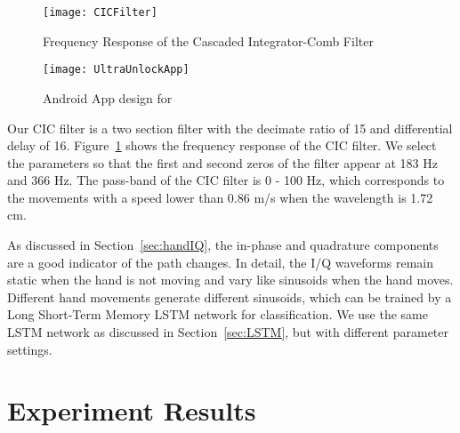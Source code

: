 \begin{figure}[h]
	\centering
	\texttt{[image: CICFilter]}
	\caption{Frequency Response of the Cascaded Integrator-Comb Filter}
	\label{fig:CICFilter}
\end{figure}


\begin{landscape}
	\begin{figure}[h]
		\centering
		\vspace{-1.7in}
		\texttt{[image: UltraUnlockApp]}
		\vspace{-1.5in}
		\caption{Android App design for {\uu}}
		\label{fig:ultraunlockapp}
	\end{figure}
\end{landscape}

Our CIC filter is a two section filter with the decimate ratio of 15 and differential delay of 16. Figure~\ref{fig:CICFilter} shows the frequency response of the CIC filter. We select the parameters so that the first and second zeros of the filter appear at 183 Hz and 366 Hz. The pass-band of the CIC filter is 0 - 100 Hz, which corresponds to the movements with a speed lower than 0.86 m/s when the wavelength is 1.72 cm. 

As discussed in Section~\ref{sec:handIQ}, the in-phase and quadrature components are a good indicator of the path changes. In detail, the I/Q waveforms remain static when the hand is not moving and vary like sinusoids when the hand moves. Different hand movements generate different sinusoids, which can be trained by a Long Short-Term Memory LSTM network for classification.  We use the same LSTM network as discussed in Section~\ref{sec:LSTM}, but with different parameter settings.

\section{Experiment Results}

